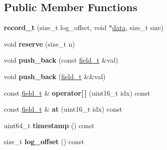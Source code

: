 \subsection*{Public Member Functions}
\begin{DoxyCompactItemize}
\item 
\mbox{\label{structdialog_1_1record__t_a3e010a7750deea6edd3ea9b7c557c900}} 
{\bfseries record\+\_\+t} (size\+\_\+t log\+\_\+offset, void $\ast$\hyperlink{structdialog_1_1data}{data}, size\+\_\+t size)
\item 
\mbox{\label{structdialog_1_1record__t_a003ed255f19d457f16ca593f841912e0}} 
void {\bfseries reserve} (size\+\_\+t n)
\item 
\mbox{\label{structdialog_1_1record__t_aa52eed245247cc9546c8f54a1bb79626}} 
void {\bfseries push\+\_\+back} (const \hyperlink{structdialog_1_1field__t}{field\+\_\+t} \&val)
\item 
\mbox{\label{structdialog_1_1record__t_a6e1501e143bccb395442eaedd6d2352a}} 
void {\bfseries push\+\_\+back} (\hyperlink{structdialog_1_1field__t}{field\+\_\+t} \&\&val)
\item 
\mbox{\label{structdialog_1_1record__t_a0c2bf230c9156eaba00a3ceabfcb95d7}} 
const \hyperlink{structdialog_1_1field__t}{field\+\_\+t} \& {\bfseries operator\mbox{[}$\,$\mbox{]}} (uint16\+\_\+t idx) const
\item 
\mbox{\label{structdialog_1_1record__t_a11abc485ed657db030ddbe441e1d45d3}} 
const \hyperlink{structdialog_1_1field__t}{field\+\_\+t} \& {\bfseries at} (uint16\+\_\+t idx) const
\item 
\mbox{\label{structdialog_1_1record__t_aa3a7c889e5f3013df010cad5217d5e11}} 
uint64\+\_\+t {\bfseries timestamp} () const
\item 
\mbox{\label{structdialog_1_1record__t_a2bd7e9bf1821ff2d23b32910c3f34934}} 
size\+\_\+t {\bfseries log\+\_\+offset} () const
\item 
\mbox{\label{structdialog_1_1record__t_a4bc3b102414bc572fdc07309ef0f0a7a}} 

\end{DoxyCompactItemize}
